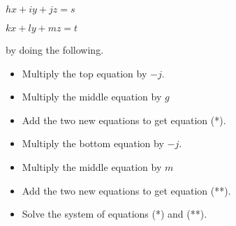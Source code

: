\documentclass[number]{ximera}
\begin{document}
\begin{enumerate}
\begin{center}
$hx+iy+jz=s$

$kx+ly+mz=t$
\end{center}

by doing the following.

\bigskip

\begin{itemize}
\item Multiply the top equation by $-j$.
\item Multiply the middle equation by $g$
\item Add the two new equations to get equation (*).
\item Multiply the bottom equation by $-j$.
\item Multiply the middle equation by $m$
\item Add the two new equations to get equation (**).
\item Solve the system of equations (*) and (**).
\end{itemize}
\end{enumerate}
\end{document}
